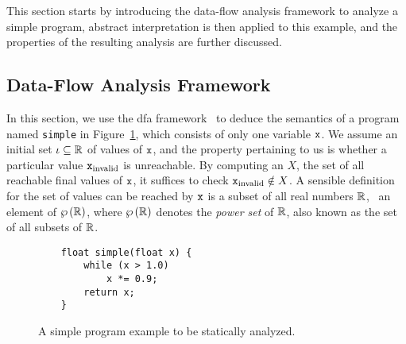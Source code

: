 This section starts by introducing the data-flow analysis framework to analyze
a simple program, abstract interpretation is then applied to this example, and
the properties of the resulting analysis are further discussed.


\subsection{Data-Flow Analysis Framework}
\label{bg:sub:data_flow}

In this section, we use the \gls{dfa} framework~\cite{nielson99} to deduce
the semantics of a program named \verb|simple| in Figure~\ref{bg:lst:simple},
which consists of only one variable $\texttt{x}$.  We assume an initial set $\iota
\subseteq \mathbb{R}$ of values of $\texttt{x}$, and the property pertaining to us
is whether a particular value $\texttt{x}_\mathrm{invalid}$ is unreachable.  By
computing an $X$, the set of all reachable final values of $\texttt{x}$, it suffices
to check $\texttt{x}_\mathrm{invalid} \notin X$.  A sensible definition for the set
of values can be reached by $\texttt{x}$ is a subset of all real numbers $\mathbb{R}$,
\ie~an element of $\wp\left({\mathbb{R}}\right)$, where $\wp\left({\mathbb{R}}\right)$ denotes
the \emph{power set} of $\mathbb{R}$, also known as the set of all subsets of
$\mathbb{R}$.
\begin{figure}[ht]
    \centering
    \begin{minipage}{0.5\textwidth}
    \begin{lstlisting}
    float simple(float x) {
        while (x > 1.0)
            x *= 0.9;
        return x;
    }
    \end{lstlisting}
    \end{minipage}
    \caption{%
        A simple program example to be statically analyzed.
    }\label{bg:lst:simple}
\end{figure}

